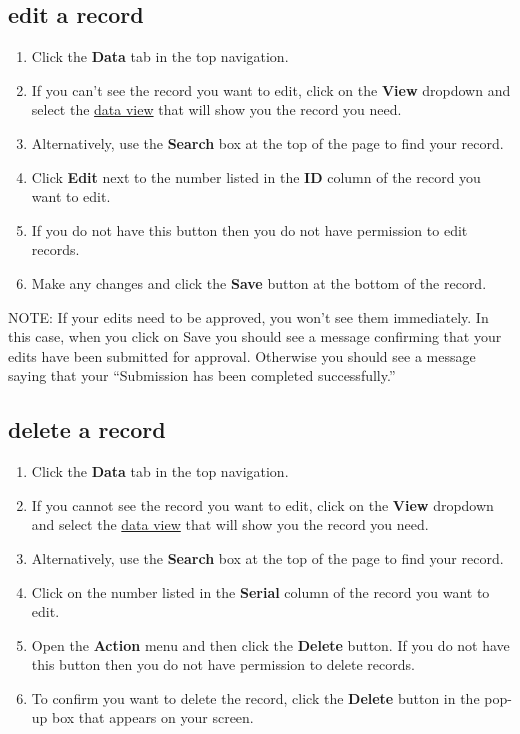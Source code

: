 \documentclass{ctrlo-int-toc}
\begin{document}
\subsection[edit a record]{edit a record}
\label{subsec:editrecord}
\begin{enumerate}
\item Click the \textbf{Data} tab in the top navigation.
\item If you can't see the record you want to edit, click on the \textbf{View} dropdown and select the \hyperref[sec:views]{data view} that will show you the record you need.
\item Alternatively, use the \textbf{Search} box at the top of the page to find your record.
\item Click \textbf{Edit} next to the number listed in the \textbf{ID} column of the record you want to edit.
\item If you do not have this button then you do not have permission to edit records.
\item Make any changes and click the \textbf{Save} button at the bottom of the record.
\end{enumerate}
\begin{notebox}
NOTE: If your edits need to be approved, you won't see them immediately. In this case, when you click on Save you should see a message confirming that your edits have been submitted for approval. Otherwise you should see a message saying that your ``Submission has been completed successfully.''
\end{notebox}

\subsection[delete a record]{delete a record}
\begin{enumerate}
\item Click the \textbf{Data} tab in the top navigation.
\item If you cannot see the record you want to edit, click on the \textbf{View} dropdown and select the \hyperref[sec:views]{data view} that will show you the record you need.
\item Alternatively, use the \textbf{Search} box at the top of the page to find your record.
\item Click on the number listed in the \textbf{Serial} column of the record you want to edit.
\item Open the \textbf{Action} menu and then click the \textbf{Delete} button. If you do not have this button then you do not have permission to delete records.
\item To confirm you want to delete the record, click the \textbf{Delete} button in the pop-up box that appears on your screen. 
\end{enumerate}
\end{document}
